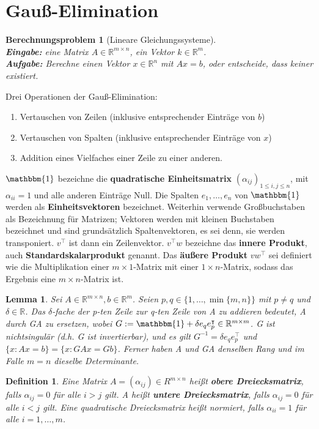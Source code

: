 \documentclass[12pt,a4paper]{article}
\theoremstyle{plain}
\newtheorem{Lemma}[Theorem]{Lemma}
\newtheorem{Definition}[Theorem]{Definition}
\newtheorem{Berechnungsproblem}[Theorem]{Berechnungsproblem}
\newcommand{\herv}[1]{{\emph{\textbf{#1}}}}
\newcommand{\R}{\mathbb{R}}
\numberwithin{equation}{section}
\begin{document}
\section{Gauß-Elimination}
\begin{Berechnungsproblem}[Lineare Gleichungssysteme]\\
\textbf{Eingabe:} eine Matrix $A\in \R^{m\times n}$, ein Vektor $k\in\R^m$.\\
\textbf{Aufgabe:} Berechne einen Vektor $x\in \R^n$ mit $Ax=b$, oder entscheide, dass keiner existiert.
\end{Berechnungsproblem}
Drei Operationen der Gauß-Elimination:
\begin{enumerate}
\renewcommand{\labelenumi}{(\arabic{enumi})}
\item Vertauschen von Zeilen (inklusive entsprechender Einträge von $b$)
\item Vertauschen von Spalten (inklusive entsprechender Einträge von $x$)
\item Addition eines Vielfaches einer Zeile zu einer anderen.
\end{enumerate}
$\mathbbm{1}$ bezeichne die \textbf{quadratische Einheitsmatrix} $(\alpha_{ij})_{1\leq i,j\leq n}$, mit $\alpha_{ii}=1$ und alle anderen Einträge Null. Die Spalten $e_1,\ldots,e_n$ von $\mathbbm{1}$ werden als \textbf{Einheitsvektoren} bezeichnet. Weiterhin verwende Großbuchstaben als Bezeichnung für Matrizen; Vektoren werden mit kleinen Buchstaben bezeichnet und sind grundsätzlich Spaltenvektoren, es sei denn, sie werden transponiert. $v^\intercal$ ist dann ein Zeilenvektor. $v^\intercal w$ bezeichne das \textbf{innere Produkt}, auch \textbf{Standardskalarprodukt} genannt. Das \textbf{äußere Produkt} $v w^\intercal$ sei definiert wie die Multiplikation einer $m\times 1$-Matrix mit einer $1\times n$-Matrix, sodass das Ergebnis eine $m\times n$-Matrix ist.
\begin{Lemma}
Sei $A\in \R^{m\times n}, b\in \R^m$. Seien $p,q\in \{1,\ldots,\min\{m,n\}\}$ mit $p\neq q$ und $\delta\in \R$. Das $\delta$-fache der p-ten Zeile zur q-ten Zeile von A zu addieren bedeutet, A durch GA zu ersetzen, wobei $G:=\mathbbm{1}+\delta e_q e_p^\intercal \in \R^{m\times m}$. G ist nichtsingulär (d.h. G ist invertierbar), und es gilt $G^{-1}=\delta e_q e_p^\intercal$ und $\{x: Ax=b\}=\{x: GAx=Gb\}$. Ferner haben A und GA denselben Rang und im Falle $m=n$ dieselbe Determinante.
\end{Lemma}
\begin{Definition}
Eine Matrix $A=(\alpha_{ij})\in R^{m\times n}$ heißt \herv{obere Dreiecksmatrix}, falls $\alpha_{ij}=0$ für alle $i>j$ gilt. A heißt \herv{untere Dreiecksmatrix}, falls $\alpha_{ij}=0$ für alle $i<j$ gilt. Eine quadratische Dreiecksmatrix heißt normiert, falls $\alpha_{ii}=1$ für alle $i=1,\ldots,m$.
\end{Definition}
\end{document}
